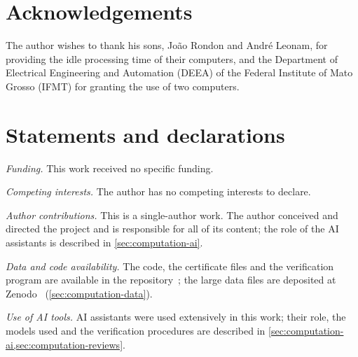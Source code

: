 \section*{Acknowledgements}

The author wishes to thank his sons, Jo\~ao Rondon and Andr\'e Leonam, for providing the idle processing time of
their computers, and the Department of Electrical Engineering and Automation (DEEA) of the Federal Institute of Mato
Grosso (IFMT) for granting the use of two computers.

\section*{Statements and declarations}

\emph{Funding.} This work received no specific funding.

\emph{Competing interests.} The author has no competing interests to declare.

\emph{Author contributions.} This is a single-author work. The author conceived and directed the project and is
responsible for all of its content; the role of the AI assistants is described in \cref{sec:computation-ai}.

\emph{Data and code availability.} The code, the certificate files and the verification program are available
in the repository~\cite{Repo2026}; the large data files are deposited at Zenodo~\cite{Zenodo2026}
(\cref{sec:computation-data}).

\emph{Use of AI tools.} AI assistants were used extensively in this work; their role, the models used and the
verification procedures are described in \cref{sec:computation-ai,sec:computation-reviews}.
